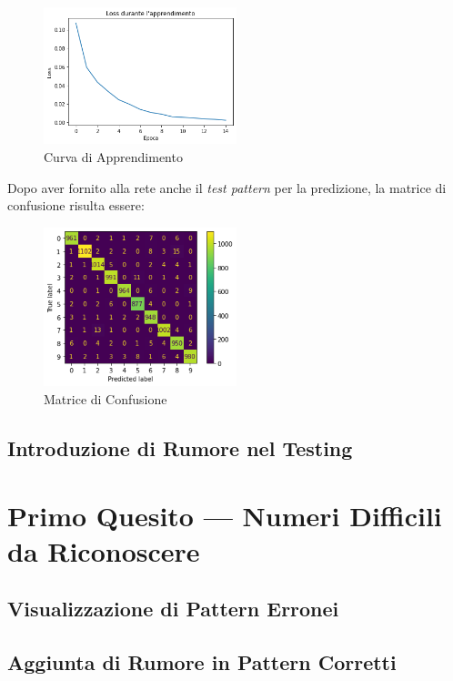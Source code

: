 \documentclass[12pt, a4paper]{article}
\begin{document}
\begin{figure}
    \centering
    \includegraphics[width=0.50\textwidth]{CurvaApprendimentoConvoluzionale}
    \caption{Curva di Apprendimento}
\end{figure}

Dopo aver fornito alla rete anche il \textit{test pattern} per la predizione, la matrice di confusione risulta essere:
\begin{figure}
    \centering
    \includegraphics[width=0.50\textwidth]{MatriceConfusioneConvoluzionale}
    \caption{Matrice di Confusione}
\end{figure}

\subsection{Introduzione di Rumore nel Testing}

\newpage
\section{Primo Quesito --- Numeri Difficili da Riconoscere}
\subsection{Visualizzazione di Pattern Erronei}
\subsection{Aggiunta di Rumore in Pattern Corretti}
\end{document}
